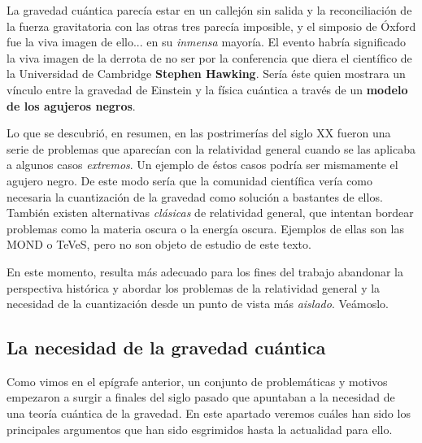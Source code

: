 \documentclass[11pt,a4paper,titlepage]{article}
\begin{document}
La gravedad cuántica parecía estar en un callejón sin salida y la reconciliación de la fuerza gravitatoria con las otras tres parecía imposible, y el simposio de Óxford fue la viva imagen de ello... en su \textit{inmensa} mayoría. El evento habría significado la viva imagen de la derrota de no ser por la conferencia que diera el científico de la Universidad de Cambridge \textbf{Stephen Hawking}. Sería éste quien mostrara un vínculo entre la gravedad de Einstein y la física cuántica a través de un \textbf{modelo de los agujeros negros}.

Lo que se descubrió, en resumen, en las postrimerías del siglo XX fueron una serie de problemas que aparecían con la relatividad general cuando se las aplicaba a algunos casos \textit{extremos}. Un ejemplo de éstos casos podría ser mismamente el agujero negro. De este modo sería que la comunidad científica vería como necesaria la cuantización de la gravedad como solución a bastantes de ellos. También existen alternativas \textit{clásicas} de relatividad general, que intentan bordear problemas como la materia oscura o la energía oscura. Ejemplos de ellas son las MOND o TeVeS, pero no son objeto de estudio de este texto.

En este momento, resulta más adecuado para los fines del trabajo abandonar la perspectiva histórica y abordar los problemas de la relatividad general y la necesidad de la cuantización desde un punto de vista más \textit{aislado}. Veámoslo.


\subsection{La necesidad de la gravedad cuántica}
\par Como vimos en el epígrafe anterior, un conjunto de problemáticas y motivos empezaron a surgir a finales del siglo pasado que apuntaban a la necesidad de una teoría cuántica de la gravedad. En este apartado veremos cuáles han sido los principales argumentos que han sido esgrimidos hasta la actualidad para ello.
\end{document}
